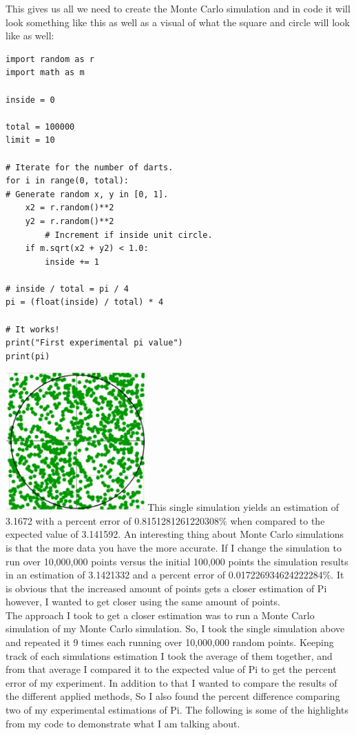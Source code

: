 \documentclass{llncs}
\begin{document}
This gives us all we need to create the Monte Carlo simulation and in code it will look something like this as well as a visual of what the square and circle will look like as well:\\
\begin{lstlisting}
import random as r
import math as m

inside = 0

total = 100000
limit = 10

# Iterate for the number of darts.
for i in range(0, total):
# Generate random x, y in [0, 1].
    x2 = r.random()**2
    y2 = r.random()**2
        # Increment if inside unit circle.
    if m.sqrt(x2 + y2) < 1.0:
        inside += 1

# inside / total = pi / 4
pi = (float(inside) / total) * 4

# It works!
print("First experimental pi value")
print(pi)

\end{lstlisting}
\includegraphics[width=0.4\textwidth, center]{simulatedPi} \newline
This single simulation yields an estimation of 3.1672 with a percent error of 0.8151281261220308\% when compared to the expected value of 3.141592. An interesting thing about Monte Carlo simulations is that the more data you have the more accurate. If I change the simulation to run over 10,000,000 points versus the initial 100,000 points the simulation results in an estimation of 3.1421332 and a percent error of 0.017226934624222284\%. It is obvious that the increased amount of points gets a closer estimation of Pi however, I wanted to get closer using the same amount of points.\\
The approach I took to get a closer estimation was to run a Monte Carlo simulation of my Monte Carlo simulation. So, I took the single simulation above and repeated it 9 times each running over 10,000,000 random points. Keeping track of each simulations estimation I took the average of them together, and from that average I compared it to the expected value of Pi to get the percent error of my experiment. In addition to that I wanted to compare the results of the different applied methods, So I also found the percent difference comparing two of my experimental estimations of Pi. The following is some of the highlights from my code to demonstrate what I am talking about.\\
\end{document}
